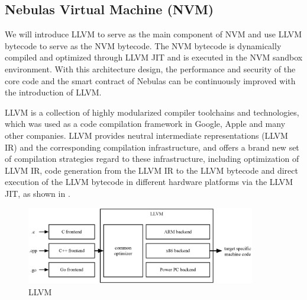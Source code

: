 \subsection{Nebulas Virtual Machine (NVM)}
\label{sec:nvm}

We will introduce LLVM \cite{llvm} to serve as the main component of NVM and
use LLVM bytecode to serve as the NVM bytecode. The NVM bytecode is dynamically
compiled and optimized through LLVM JIT and is executed in the NVM sandbox environment. With this architecture design, the performance and security of the core code and the smart contract of Nebulas can be continuously improved with the introduction of LLVM. 


LLVM is a collection of highly modularized compiler toolchains and
technologies, which was used as a code compilation framework in Google, Apple
and many other companies. LLVM provides neutral intermediate representations
(LLVM IR) and the corresponding compilation infrastructure, and offers a brand
new set of compilation strategies regard to these infrastructure, including
optimization of LLVM IR, code generation from the LLVM IR to the LLVM bytecode
and direct execution of the LLVM bytecode in different hardware platforms via
the LLVM JIT, as shown in . \\


\begin{figure}[h]
\centering
\includegraphics[width=10cm]{./figs/llvm}
\caption{LLVM}
\label{fig:llvm}
\end{figure}

